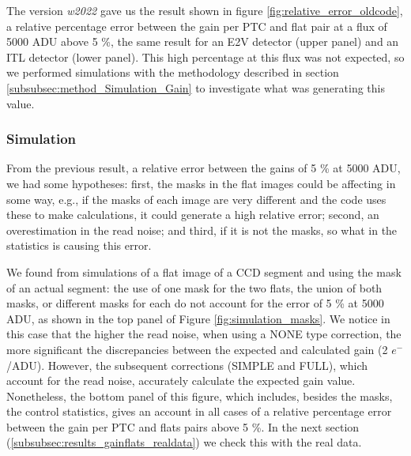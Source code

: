 The version \textit{w2022} gave us the result shown in figure \ref{fig:relative_error_oldcode}, a relative percentage error between the gain per PTC and flat pair at a flux of 5000 ADU above 5 \%, the same result for an E2V detector (upper panel) and an ITL detector (lower panel). This high percentage at this flux was not expected, so we performed simulations with the methodology described in section \ref{subsubsec:method_Simulation_Gain} to investigate what was generating this value.


\subsubsection{Simulation}

From the previous result, a relative error between the gains of 5 \% at 5000 ADU, we had some hypotheses: first, the masks in the flat images could be affecting in some way, e.g.,  if the masks of each image are very different and the code uses these to make calculations, it could generate a high relative error; second, an overestimation in the read noise; and third, if it is not the masks, so what in the statistics is causing this error. 

\vspace{3mm}

We found from simulations of a flat image of a CCD segment and using the mask of an actual segment: the use of one mask for the two flats, the union of both masks, or different masks for each do not account for the error of 5 \% at 5000 ADU, as shown in the top panel of Figure \ref{fig:simulation_masks}. We notice in this case that the higher the read noise, when using a NONE type correction, the more significant the discrepancies between the expected and calculated gain (2 $e^-$/ADU). However,  the subsequent corrections (SIMPLE and FULL), which account for the read noise, accurately calculate the expected gain value. Nonetheless,  the bottom panel of this figure, which includes, besides the masks, the control statistics, gives an account in all cases of a relative percentage error between the gain per PTC and flats pairs above 5 \%. In the next section (\ref{subsubsec:results_gainflats_realdata}) we check this with the real data.

